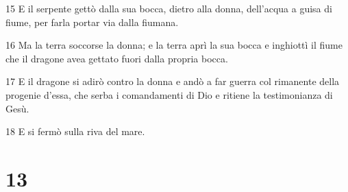 \par 15 E il serpente gettò dalla sua bocca, dietro alla donna, dell'acqua a guisa di fiume, per farla portar via dalla fiumana.
\par 16 Ma la terra soccorse la donna; e la terra aprì la sua bocca e inghiottì il fiume che il dragone avea gettato fuori dalla propria bocca.
\par 17 E il dragone si adirò contro la donna e andò a far guerra col rimanente della progenie d'essa, che serba i comandamenti di Dio e ritiene la testimonianza di Gesù.
\par 18 E si fermò sulla riva del mare.

\chapter{13}

